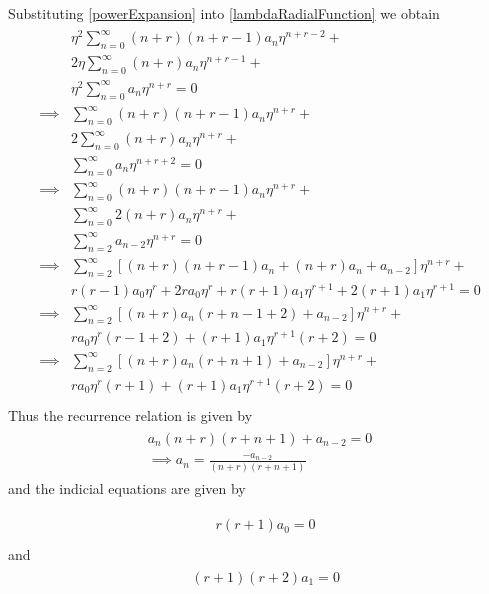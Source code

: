 \documentclass[10pt]{article}
\numberwithin{equation}{section}
\begin{document}
		Substituting \ref{powerExpansion} into \ref{lambdaRadialFunction} we obtain
		\begin{align}\label{FrobeniusSubs}
			\begin{split}
				&\eta^2 \sum_{n = 0}^{\infty} (n+r)(n+r-1)a_n \eta^{n+r-2} + \\
				&2\eta \sum_{n = 0}^{\infty} (n+r)a_n \eta^{n+r-1} + \\
				&\eta^2 \sum_{n = 0}^{\infty} a_n \eta^{n+r} = 0\\
				\implies &\sum_{n = 0}^{\infty} (n+r)(n+r-1)a_n \eta^{n+r} + \\
				&2 \sum_{n = 0}^{\infty} (n+r)a_n \eta^{n+r} + \\
				&\sum_{n = 0}^{\infty} a_n \eta^{n+r+2} = 0\\
				\implies &\sum_{n = 0}^{\infty} (n+r)(n+r-1)a_n \eta^{n+r} + \\
				&\sum_{n = 0}^{\infty} 2(n+r)a_n \eta^{n+r} + \\
				&\sum_{n = 2}^{\infty} a_{n-2} \eta^{n+r} = 0\\
				\implies &\sum_{n = 2}^{\infty} \left[(n+r)(n+r-1)a_n + (n+r)a_n + a_{n-2} \right]\eta^{n+r} + \\
				&r(r-1)a_0 \eta^r +2ra_0 \eta^r + r(r+1)a_1 \eta^{r+1} +2(r+1)a_1 \eta^{r+1} = 0\\
				\implies &\sum_{n = 2}^{\infty} \left[(n+r)a_n(r+n-1+2) + a_{n-2} \right]\eta^{n+r} + \\
				& ra_0\eta^r(r-1+2) + (r+1)a_1\eta^{r+1}(r+2)= 0\\
				\implies &\sum_{n = 2}^{\infty} \left[(n+r)a_n(r+n+1) + a_{n-2} \right]\eta^{n+r} + \\
				& ra_0\eta^r(r+1) + (r+1)a_1\eta^{r+1}(r+2)= 0\\
			\end{split}
		\end{align}
		Thus the recurrence relation is given by
		\begin{align}\label{RecurrenceRelation}
			\begin{split}
				a_n(n+r)(r+n+1) + a_{n-2} = 0\\
				\implies a_n = \frac{-a_{n-2}}{(n+r)(r+n+1)}
			\end{split}
		\end{align}
		and the indicial equations are given by 
		
		\begin{align}\label{a0Indicial}
			\begin{split}
				& r(r+1)a_0= 0\\
			\end{split}
		\end{align}
		and
				\begin{align}\label{a1Indicial}
			\begin{split}
				&(r+1)(r+2)a_1= 0\\
			\end{split}
		\end{align}
		
\end{document}
